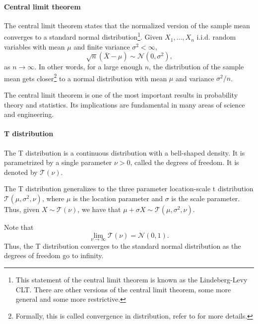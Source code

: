 \paragraph{Central limit theorem}  The central limit theorem states that the normalized
version of the sample mean converges to a standard normal distribution\footnote{This
statement of the central limit theorem is known as the Lindeberg-Levy CLT.  There are
other versions of the central limit theorem, some more general and some more
restrictive.}. Given $X_1, \dots, X_n$ i.i.d. random variables with mean $\mu$ and finite
variance $\sigma^2 < \infty$,
\begin{equation*}
  \sqrt{n} (\bar{X} - \mu) \sim \mathcal{N}(0, \sigma^2)\text{,}
\end{equation*}
as $n \rightarrow \infty$.  In other words, for a large enough $n$, the distribution of
the sample mean gets closer\footnote{Formally, this is called convergence in distribution,
refer to  for more details.} to a normal distribution with mean
$\mu$ and variance $\sigma^2/n$.

The central limit theorem is one of the most important results in probability theory and
statistics.  Its implications are fundamental in many areas of science and engineering.

\paragraph{T distribution} The T distribution is a continuous distribution with a
bell-shaped density.  It is parametrized by a single parameter $\nu > 0$, called the
degrees of freedom.  It is denoted by $\mathcal{T}(\nu)$.


The T distribution generalizes to the three parameter location-scale t distribution
$\mathcal{T}(\mu, \sigma^2, \nu)$, where $\mu$ is the location parameter and $\sigma$ is
the scale parameter.  Thus, given $X \sim \mathcal{T}(\nu)$, we have that
$\mu + \sigma X \sim \mathcal{T}(\mu, \sigma^2, \nu)$.

Note that $$\lim_{\nu \rightarrow \infty} \mathcal{T}(\nu) = \mathcal{N}(0, 1)\text{.}$$
Thus, the T distribution converges to the standard normal distribution as the degrees of
freedom go to infinity.

